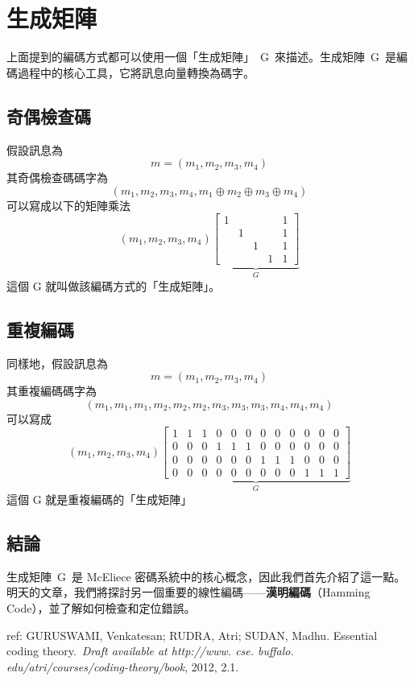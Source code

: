 \documentclass[
]{article}
\begin{document}
\hypertarget{ux751fux6210ux77e9ux9663}{%
\section{生成矩陣}\label{ux751fux6210ux77e9ux9663}}

上面提到的編碼方式都可以使用一個「生成矩陣」~G~來描述。生成矩陣~G~是編碼過程中的核心工具，它將訊息向量轉換為碼字。

\hypertarget{ux5947ux5076ux6aa2ux67e5ux78bc}{%
\subsection{奇偶檢查碼}\label{ux5947ux5076ux6aa2ux67e5ux78bc}}

假設訊息為 \[
m = (m_{1},m_{2},m_{3},m_{4})
\] 其奇偶檢查碼碼字為 \[
(m_{1},m_{2},m_{3},m_{4},m_{1}\oplus m_{2}\oplus m_{3}\oplus m_{4})
\] 可以寫成以下的矩陣乘法 \[
(m_{1},m_{2},m_{3},m_{4})
\underbrace{ \begin{bmatrix}
1 &&&&1 \\
& 1&&&1 \\
&&1&&1 \\
&&&1&1
\end{bmatrix}  }_{ G }
\] 這個 G 就叫做該編碼方式的「生成矩陣」。

\hypertarget{ux91cdux8907ux7de8ux78bc}{%
\subsection{重複編碼}\label{ux91cdux8907ux7de8ux78bc}}

同樣地，假設訊息為 \[
m = (m_{1},m_{2},m_{3},m_{4})
\] 其重複編碼碼字為 \[
(m_{1},m_{1},m_{1},m_{2},m_{2},m_{2},m_{3},m_{3},m_{3},m_{4},m_{4},m_{4})
\] 可以寫成 \[
(m_{1},m_{2},m_{3},m_{4})
\underbrace{
\left[
\begin{array}{cccccccccccc}
1 & 1 & 1 & 0 & 0 & 0 & 0 & 0 & 0 & 0 & 0 & 0 \\
0 & 0 & 0 & 1 & 1 & 1 & 0 & 0 & 0 & 0 & 0 & 0 \\
0 & 0 & 0 & 0 & 0 & 0 & 1 & 1 & 1 & 0 & 0 & 0 \\
0 & 0 & 0 & 0 & 0 & 0 & 0 & 0 & 0 & 1 & 1 & 1
\end{array}
\right]
}_{G}
\] 這個 G 就是重複編碼的「生成矩陣」

\hypertarget{ux7d50ux8ad6}{%
\subsection{結論}\label{ux7d50ux8ad6}}

生成矩陣~G~是 McEliece
密碼系統中的核心概念，因此我們首先介紹了這一點。明天的文章，我們將探討另一個重要的線性編碼------\textbf{漢明編碼}（Hamming
Code），並了解如何檢查和定位錯誤。

ref: GURUSWAMI, Venkatesan; RUDRA, Atri; SUDAN, Madhu. Essential coding
theory.~\emph{Draft available at http://www. cse. buffalo.
edu/atri/courses/coding-theory/book}, 2012, 2.1.
\end{document}
